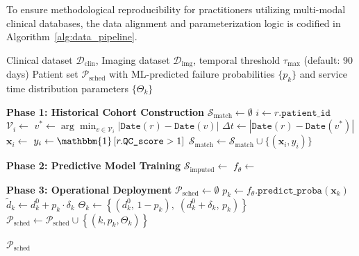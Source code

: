 \documentclass[11pt,a4paper]{article}
\begin{document}
To ensure methodological reproducibility for practitioners utilizing multi-modal clinical databases, the data alignment and parameterization logic is codified in Algorithm~\ref{alg:data_pipeline}.

\begin{algorithm}[H]
\caption{Asynchronous Data Alignment and Stochastic Parameterization}
\label{alg:data_pipeline}
\begin{algorithmic}[1]
\Require Clinical dataset $\mathcal{D}_{\text{clin}}$, Imaging dataset $\mathcal{D}_{\text{img}}$, temporal threshold $\tau_{\max}$ (default: 90 days)
\Ensure Patient set $\mathcal{P}_{\text{sched}}$ with ML-predicted failure probabilities $\{p_k\}$ and service time distribution parameters $\{\Theta_k\}$

\Statex \textbf{Phase 1: Historical Cohort Construction}
\State $\mathcal{S}_{\text{match}} \gets \emptyset$ 
    \State $i \gets r.\texttt{patient\_id}$
    \State $\mathcal{V}_i \gets$  
    \State $v^* \gets \arg\min_{v \in \mathcal{V}_i} \left| \texttt{Date}(r) - \texttt{Date}(v) \right|$
    \State $\Delta t \gets \left| \texttt{Date}(r) - \texttt{Date}(v^*) \right|$
        \State $\mathbf{x}_i \gets$  
        \State $y_i \gets \mathbbm{1}\left[ r.\texttt{QC\_score} > 1 \right]$ 
        \State $\mathcal{S}_{\text{match}} \gets \mathcal{S}_{\text{match}} \cup \{(\mathbf{x}_i, y_i)\}$
    \EndIf
\EndFor

\Statex \textbf{Phase 2: Predictive Model Training}
\State $\mathcal{S}_{\text{imputed}} \gets$  
\State $f_{\theta} \gets$ 

\Statex \textbf{Phase 3: Operational Deployment}
\State $\mathcal{P}_{\text{sched}} \gets \emptyset$
    \State $p_k \gets f_{\theta}.\texttt{predict\_proba}(\mathbf{x}_k)$ 
    \State $\tilde{d}_k \gets d_k^0 + p_k \cdot \delta_k$ 
    \State $\Theta_k \gets \left\{ (d_k^0,\, 1 - p_k),\; (d_k^0 + \delta_k,\, p_k) \right\}$ 
    \State $\mathcal{P}_{\text{sched}} \gets \mathcal{P}_{\text{sched}} \cup \left\{ (k, p_k, \Theta_k) \right\}$
\EndFor

\State \Return $\mathcal{P}_{\text{sched}}$
\end{algorithmic}
\end{algorithm}
 
\end{document}

